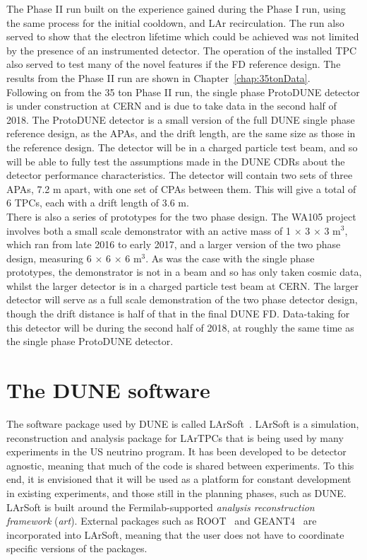 The Phase II run built on the experience gained during the Phase I run, using the same process for the initial cooldown, and LAr recirculation. The run also served to show that the electron lifetime which could be achieved was not limited by the presence of an instrumented detector. The operation of the installed TPC also served to test many of the novel features if the FD reference design. The results from the Phase II run are shown in Chapter~\ref{chap:35tonData}. \\

Following on from the 35 ton Phase II run, the single phase ProtoDUNE detector is under construction at CERN and is due to take data in the second half of 2018. The ProtoDUNE detector is a small version of the full DUNE single phase reference design, as the APAs, and the drift length, are the same size as those in the reference design. The detector will be in a charged particle test beam, and so will be able to fully test the assumptions made in the DUNE CDRs about the detector performance characteristics. The detector will contain two sets of three APAs, 7.2 m apart, with one set of CPAs between them. This will give a total of 6 TPCs, each with a drift length of 3.6 m. \\

There is also a series of prototypes for the two phase design. The WA105 project involves both a small scale demonstrator with an active mass of 1 $\times$ 3 $\times$ 3 m$^3$, which ran from late 2016 to early 2017, and a larger version of the two phase design, measuring 6 $\times$ 6 $\times$ 6 m$^3$. As was the case with the single phase prototypes, the demonstrator is not in a beam and so has only taken cosmic data, whilst the larger detector is in a charged particle test beam at CERN. The larger detector will serve as a full scale demonstration of the two phase detector design, though the drift distance is half of that in the final DUNE FD. Data-taking for this detector will be during the second half of 2018, at roughly the same time as the single phase ProtoDUNE detector. \\

\section{The DUNE software} \label{sec:LArSoft} %
The software package used by DUNE is called LArSoft~\citep{Church_LArSoft, LArSoftOrg}. LArSoft is a simulation, reconstruction and analysis package for LArTPCs that is being used by many experiments in the US neutrino program. It has been developed to be detector agnostic, meaning that much of the code is shared between experiments. To this end, it is envisioned that it will be used as a platform for constant development in existing experiments, and those still in the planning phases, such as DUNE. LArSoft is built around the Fermilab-supported \emph{analysis reconstruction framework} (\emph{art}). External packages such as ROOT~\citep{ROOT} and GEANT4~\citep{GEANT4} are incorporated into LArSoft, meaning that the user does not have to coordinate specific versions of the packages. \\

